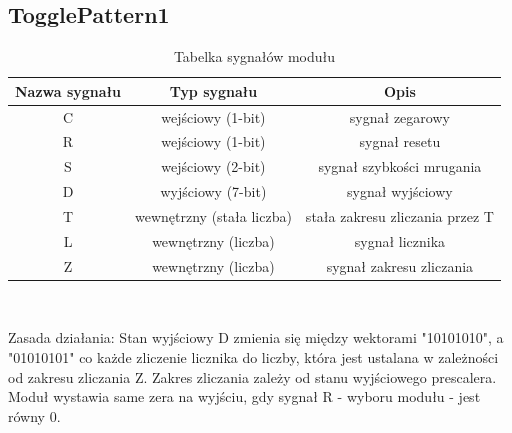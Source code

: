 \documentclass{article}
\begin{document}
\subsection{TogglePattern1}
\begin{table}[H]
    \centering
    \begin{tabular}{|c|c|c|}
        \hline
        Nazwa sygnału & Typ sygnału & Opis \\
        \hline
        C  & wejściowy (1-bit)    & sygnał zegarowy    \\
        \hline
        R  & wejściowy (1-bit)   & sygnał resetu   \\
        \hline
        S  & wejściowy (2-bit)    & sygnał szybkości mrugania\\
        \hline
        D  & wyjściowy (7-bit)    & sygnał wyjściowy\\
        \hline
        T  & wewnętrzny (stała liczba) & stała zakresu zliczania przez T  \\
        \hline
        L  & wewnętrzny (liczba) & sygnał licznika \\
        \hline
        Z  & wewnętrzny (liczba) & sygnał zakresu zliczania \\
        \hline
    \end{tabular}\\
    \caption{Tabelka sygnałów modułu}
    \label{tab:tabela4}
\end{table}
Zasada działania: Stan wyjściowy D zmienia się między wektorami "10101010", a "01010101" co każde zliczenie licznika do liczby, która jest ustalana w 
zależności od zakresu zliczania Z. Zakres zliczania zależy od stanu wyjściowego prescalera. Moduł wystawia same zera na wyjściu, gdy sygnał R - wyboru modułu - jest równy 0. 
\end{document}
